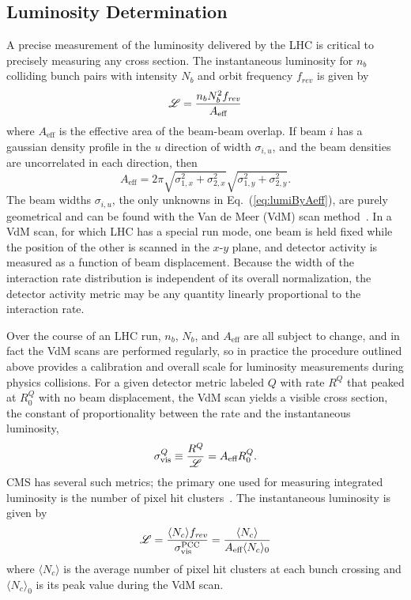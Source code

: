 \subsection{Luminosity Determination}
A precise measurement of the luminosity delivered by the LHC is critical to precisely measuring any cross section.
The instantaneous luminosity for $n_b$ colliding bunch pairs with intensity $N_b$ and orbit frequency $f_\textit{rev}$ is given by
\begin{equation}\label{eq:lumiByAeff}
  \mathscr{L} = \frac{n_b N_b^2 f_\textit{rev}}{A_\text{eff}}
\end{equation}
where $A_\text{eff}$ is the effective area of the beam-beam overlap.
If beam $i$ has a gaussian density profile in the $u$ direction of width $\sigma_{i,u}$, and the beam densities are uncorrelated in each direction, then
\begin{equation}
  A_\text{eff} = 2\pi \sqrt{\sigma_{1,x}^2 + \sigma_{2,x}^2} \sqrt{\sigma_{1,y}^2 + \sigma_{2,y}^2}.
\end{equation}
The beam widths $\sigma_{i,u}$, the only unknowns in Eq.~(\ref{eq:lumiByAeff}), are purely geometrical and can be found with the Van de Meer (VdM) scan method~\cite{vanderMeer:1968zz,Zanetti:1357856}.
In a VdM scan, for which LHC has a special run mode, one beam is held fixed while the position of the other is scanned in the $x$-$y$ plane, and detector activity is measured as a function of beam displacement.
Because the width of the interaction rate distribution is independent of its overall normalization, the detector activity metric may be any quantity linearly proportional to the interaction rate.

Over the course of an LHC run, $n_b$, $N_b$, and $A_\text{eff}$ are all subject to change, and in fact the VdM scans are performed regularly, so in practice the procedure outlined above provides a calibration and overall scale for luminosity measurements during physics collisions.
For a given detector metric labeled $Q$ with rate $R^Q$ that peaked at $R_0^Q$ with no beam displacement, the VdM scan yields a visible cross section, the constant of proportionality between the rate and the instantaneous luminosity,
\begin{equation}
  \sigma_\text{vis}^Q \equiv \frac{R^Q}{\mathscr{L}} = A_\text{eff} R_0^Q.
\end{equation}
CMS has several such metrics; the primary one used for measuring integrated luminosity is the number of pixel hit clusters~\cite{CMS-PAS-LUM-15-001,CMS-PAS-LUM-17-001}.
The instantaneous luminosity is given by
\begin{equation}
  \mathscr{L} = \frac{\langle N_c \rangle f_\textit{rev}}{\sigma_\text{vis}^\text{PCC}} = \frac{\langle N_c \rangle}{A_\text{eff} \langle N_c \rangle_0}
\end{equation}
where $\langle N_c \rangle$ is the average number of pixel hit clusters at each bunch crossing and $\langle N_c \rangle_0$ is its peak value during the VdM scan.

